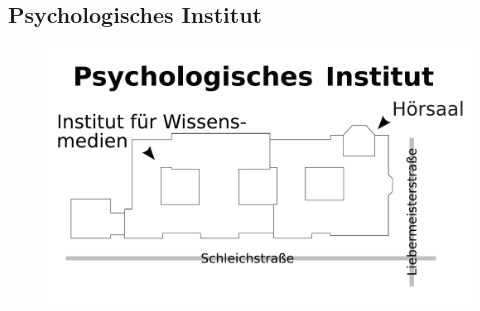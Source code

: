 \subsection*{Psychologisches Institut}
\begin{figure}[ht!]
	\centering
	\includegraphics[width=\textwidth]{kogni/anhang/lageplaene/uebersicht_pi.pdf}
\end{figure}
